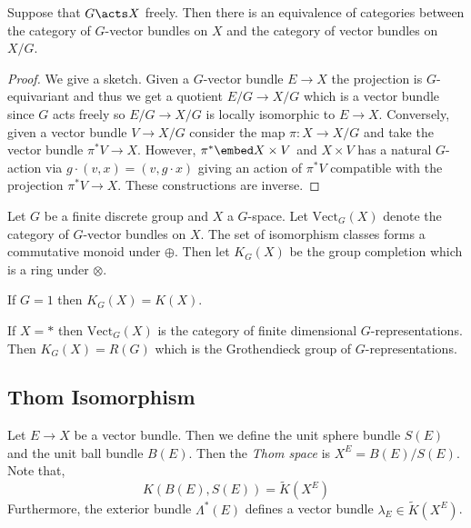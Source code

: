 \documentclass[12pt]{extarticle}
\newcommand{\Vect}{\mathrm{Vect}}
\begin{document}
\begin{prop}
Suppose that $G \acts X$ freely. Then there is an equivalence of categories between the category of $G$-vector bundles on $X$ and the category of vector bundles on $X / G$. 
\end{prop}

\begin{proof}
We give a sketch. Given a $G$-vector bundle $E \to X$ the projection is $G$-equivariant and thus we get a quotient $E / G \to X / G$ which is a vector bundle since $G$ acts freely so $E/G \to X/G$ is locally isomorphic to $E \to X$. Conversely, given a vector bundle $V \to X/G$ consider the map $\pi : X \to X / G$ and take the vector bundle $\pi^* V \to X$. However, $\pi^* \embed X \times V$ and $X \times V$ has a natural $G$-action via $g \cdot (v, x) = (v, g \cdot x)$ giving an action of $\pi^* V$ compatible with the projection $\pi^* V \to X$. These constructions are inverse.  
\end{proof}

\begin{defn}
Let $G$ be a finite discrete group and $X$ a $G$-space. Let $\Vect_G(X)$ denote the category of $G$-vector bundles on $X$. The set of isomorphism classes forms a commutative monoid under $\oplus$. Then let $K_G(X)$ be the group completion which is a ring under $\otimes$.
\end{defn}

\begin{example}
If $G = 1$ then $K_G(X) = K(X)$. 
\end{example}

\begin{example}
If $X = *$ then $\Vect_G(X)$ is the category of finite dimensional $G$-representations. Then $K_G(X) = R(G)$ which is the Grothendieck group of $G$-representations. 
\end{example}

\subsection{Thom Isomorphism} 

\begin{defn}
Let $E \to X$ be a vector bundle. Then we define the unit sphere bundle $S(E)$ and the unit ball bundle $B(E)$. Then the \textit{Thom space} is $X^E = B(E) / S(E)$. Note that,
\[ K(B(E), S(E)) = \tilde{K}(X^E) \]
Furthermore, the exterior bundle $\Lambda^*(E)$ defines a vector bundle $\lambda_E \in \tilde{K}(X^E)$. 
\end{defn}
\end{document}
